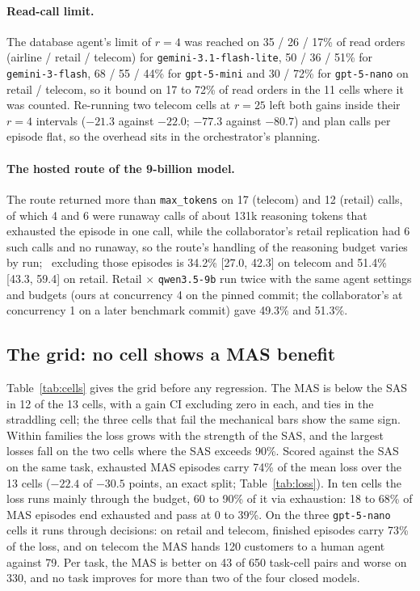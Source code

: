 \paragraph{Read-call limit.} The database agent's limit of $r = 4$ was reached on 35 / 26 / 17\% of read orders (airline / retail / telecom) for \texttt{gemini-3.1-flash-lite}, 50 / 36 / 51\% for \texttt{gemini-3-flash}, 68 / 55 / 44\% for \texttt{gpt-5-mini} and 30 / 72\% for \texttt{gpt-5-nano} on retail / telecom, so it bound on 17 to 72\% of read orders in the 11 cells where it was counted. Re-running two telecom cells at $r = 25$ left both gains inside their $r = 4$ intervals ($-21.3$ against $-22.0$; $-77.3$ against $-80.7$) and plan calls per episode flat, so the overhead sits in the orchestrator's planning.

\paragraph{The hosted route of the 9-billion model.} The route returned more than \texttt{max\_tokens} on 17 (telecom) and 12 (retail) calls, of which 4 and 6 were runaway calls of about 131k reasoning tokens that exhausted the episode in one call, while the collaborator's retail replication had 6 such calls and no runaway, so the route's handling of the reasoning budget varies by run; \passone\ excluding those episodes is 34.2\% [27.0, 42.3] on telecom and 51.4\% [43.3, 59.4] on retail. Retail $\times$ \texttt{qwen3.5-9b} run twice with the same agent settings and budgets (ours at concurrency 4 on the pinned commit; the collaborator's at concurrency 1 on a later benchmark commit) gave 49.3\% and 51.3\%.

\subsection{The grid: no cell shows a MAS benefit}
\label{sec:grid}

Table~\ref{tab:cells} gives the grid before any regression. The MAS is below the SAS in 12 of the 13 cells, with a gain CI excluding zero in each, and ties in the straddling cell; the three cells that fail the mechanical bars show the same sign. Within families the loss grows with the strength of the SAS, and the largest losses fall on the two cells where the SAS exceeds 90\%. Scored against the SAS on the same task, exhausted MAS episodes carry 74\% of the mean loss over the 13 cells ($-22.4$ of $-30.5$ points, an exact split; Table~\ref{tab:loss}). In ten cells the loss runs mainly through the budget, 60 to 90\% of it via exhaustion: 18 to 68\% of MAS episodes end exhausted and pass at 0 to 39\%. On the three \texttt{gpt-5-nano} cells it runs through decisions: on retail and telecom, finished episodes carry 73\% of the loss, and on telecom the MAS hands 120 customers to a human agent against 79. Per task, the MAS is better on 43 of 650 task-cell pairs and worse on 330, and no task improves for more than two of the four closed models.

